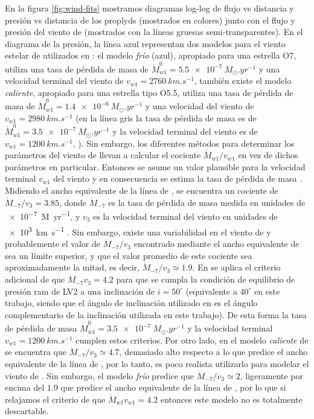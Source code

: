 En la figura \ref{fig:wind-fits} mostramos diagramas log-log de flujo vs distancia y presión vs distancia de los proplyds (mostrados en colores) junto con el flujo y presión del viento de \thC{} (mostrados con la líneas gruesas semi-transparentes). En el diagrama de la presión, la línea azul representan dos modelos para el viento estelar de \thC{} utilizados en \citet{Gagne:2005}: el modelo \textit{frío} (azul), apropiado para una estrella O7, utiliza una tasa de pérdida de masa de $\dot{M}^0_{w1} = \SI{5.5e-7}{M_\odot.yr^{-1}}$ y una velocidad terminal del viento de $v_{w1} = \SI{2760}{km.s^{-1}}$, también existe el modelo \textit{caliente}, apropiado para una estrella tipo O5.5, utiliza una tasa de pérdida de masa de $\dot{M}^0_{w1} = \SI{1.4e-6}{M_\odot.yr^{-1}}$ y una velocidad del viento de $v_{w1} = \SI{2980}{km.s^{-1}}$ (en la línea gris la tasa de pérdida de masa es de $\dot{M}^0_{w1} = \SI{3.5e-7}{M_\odot.yr^{-1}}$ y la velocidad terminal del viento es de $v_{w1} = \SI{1200}{km.s^{-1}}$, \citet{GAH:2002}). Sin embargo, los diferentes métodos para determinar los parámetros del viento de \thC{} llevan a calcular el cociente $\dot{M}_{w1}/v_{w1}$ en vez de dichos parámetros en particular. Entonces se asume un valor plausible para la velocidad terminal $v_{w1}$ del viento y en consecuencia se estima la tasa de pérdida de masa \citep{Garcia-Arredondo:2001}. Midiendo el ancho equivalente de la línea de , se encuentra un cociente de $\dot{M}_{-7}/v_{3} = 3.85$, donde $\dot{M}_{-7}$ es la tasa de pérdida de masa medida en unidades de \SI{e-7}{M_\odot.yr^{-1}}, y $v_3$ es la velocidad terminal del viento en unidades de \SI{e3}{km.s^{-1}} \citep{Garcia-Arredondo:2001}. Sin embargo, existe una variabilidad en el viento de \thC{} y probablemente el valor de  $\dot{M}_{-7}/v_{3}$ encontrado mediante el ancho equivalente de  sea un límite superior, y que el valor promedio de este cociente sea aproximadamente la mitad, es decir, $\dot{M}_{-7}/v_{3} \simeq 1.9$. En \citet{Garcia-Arredondo:2001} se aplica el criterio adicional de que $\dot{M}_{-7}v_{3} = 4.2$ para que se cumpla la condición de equilibrio de presión ram de LV2 a una inclinación de $i=50^\circ$ (equivalente a $40^\circ$ en este trabajo, siendo que el ángulo de inclinación utilizado en \citet{Garcia-Arredondo:2001} es el ángulo complementario de la inclinación utilizada en este trabajo). De esta forma la tasa de pérdida de masa $\dot{M}^0_{w1} = \SI{3.5e-7}{M_\odot.yr^{-1}}$ y la velocidad terminal $v_{w1} = \SI{1200}{km.s^{-1}}$ cumplen estos criterios. Por otro lado, en el modelo \textit{caliente} de \citet{Gagne:2005} se encuentra que $\dot{M}_{-7}/v_{3} \simeq 4.7$, demasiado alto respecto a lo que predice el ancho equivalente de la línea de , por lo tanto, es poco realista utilizarlo para modelar el viento de \thC{}. Sin embargo, el modelo \textit{frío} predice que $\dot{M}_{-7}/v_{3} \simeq 2$, ligeramente por encima del $1.9$ que predice el ancho equivalente de la línea de , por lo que si relajamos el criterio de que $\dot{M}_{w1}v_{w1} = 4.2$ entonces este modelo no es totalmente descartable.

